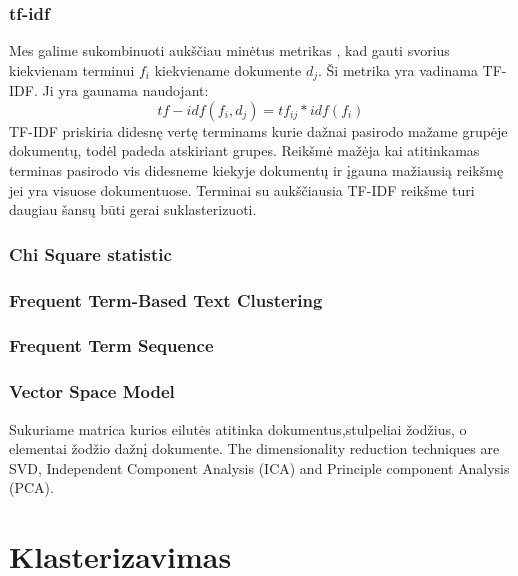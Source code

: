 \documentclass{VUMIFInfKursinis}
\begin{document}
\subsubsection{tf-idf}
Mes galime sukombinuoti aukščiau minėtus metrikas , kad gauti svorius kiekvienam terminui $f_i$ kiekviename dokumente $d_j$. Ši metrika yra vadinama TF-IDF\@. Ji yra gaunama naudojant:
\begin{equation}
	tf-idf(f_i,d_j) = tf_{ij} * idf (f_i)
\end{equation}
TF-IDF priskiria didesnę vertę terminams kurie dažnai pasirodo mažame grupėje dokumentų, todėl padeda atskiriant grupes. Reikšmė mažėja kai atitinkamas terminas pasirodo vis didesneme kiekyje dokumentų ir įgauna mažiausią reikšmę jei yra visuose dokumentuose. Terminai su aukščiausia TF-IDF reikšme turi daugiau šansų būti gerai suklasterizuoti. 
\subsubsection{Chi Square statistic}
\subsubsection{Frequent Term-Based Text Clustering}
\subsubsection{Frequent Term Sequence}
\subsubsection{Vector Space Model}
Sukuriame matrica kurios eilutės atitinka dokumentus,stulpeliai žodžius, o elementai žodžio dažnį dokumente.
The dimensionality reduction techniques are SVD, Independent Component Analysis (ICA) and Principle component Analysis (PCA). 


\section{Klasterizavimas}
\end{document}
